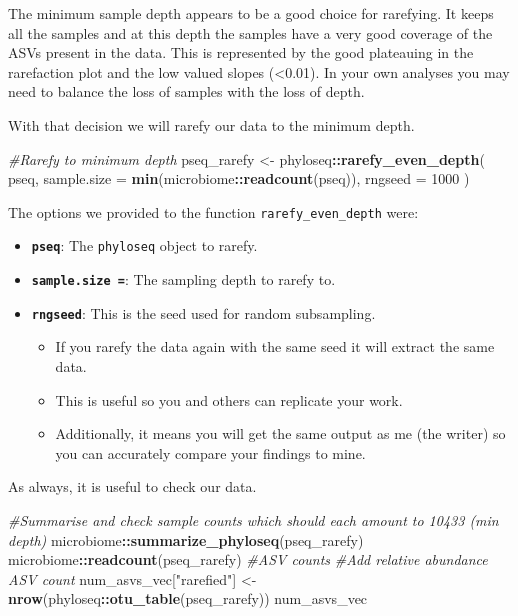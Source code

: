 \documentclass[
]{book}
\newenvironment{Shaded}{\begin{snugshade}}{\end{snugshade}}
\newcommand{\AttributeTok}[1]{\textcolor[rgb]{0.13,0.29,0.53}{#1}}
\newcommand{\CommentTok}[1]{\textcolor[rgb]{0.56,0.35,0.01}{\textit{#1}}}
\newcommand{\DecValTok}[1]{\textcolor[rgb]{0.00,0.00,0.81}{#1}}
\newcommand{\FunctionTok}[1]{\textcolor[rgb]{0.13,0.29,0.53}{\textbf{#1}}}
\newcommand{\NormalTok}[1]{#1}
\newcommand{\OtherTok}[1]{\textcolor[rgb]{0.56,0.35,0.01}{#1}}
\newcommand{\SpecialCharTok}[1]{\textcolor[rgb]{0.81,0.36,0.00}{\textbf{#1}}}
\newcommand{\StringTok}[1]{\textcolor[rgb]{0.31,0.60,0.02}{#1}}
\providecommand{\tightlist}{%
  \setlength{\itemsep}{0pt}\setlength{\parskip}{0pt}}
\begin{document}
The minimum sample depth appears to be a good choice for rarefying.
It keeps all the samples and at this depth the samples have a very good coverage of the ASVs present in the data.
This is represented by the good plateauing in the rarefaction plot and the low valued slopes (\textless0.01).
In your own analyses you may need to balance the loss of samples with the loss of depth.

With that decision we will rarefy our data to the minimum depth.

\begin{Shaded}
\begin{Highlighting}[]
\CommentTok{\#Rarefy to minimum depth}
\NormalTok{pseq\_rarefy }\OtherTok{\textless{}{-}}\NormalTok{ phyloseq}\SpecialCharTok{::}\FunctionTok{rarefy\_even\_depth}\NormalTok{(}
\NormalTok{  pseq, }\AttributeTok{sample.size =} \FunctionTok{min}\NormalTok{(microbiome}\SpecialCharTok{::}\FunctionTok{readcount}\NormalTok{(pseq)),}
  \AttributeTok{rngseed =} \DecValTok{1000}
\NormalTok{  )}
\end{Highlighting}
\end{Shaded}

The options we provided to the function \texttt{rarefy\_even\_depth} were:

\begin{itemize}
\tightlist
\item
  \textbf{\texttt{pseq}}: The \texttt{phyloseq} object to rarefy.
\item
  \textbf{\texttt{sample.size\ =}}: The sampling depth to rarefy to.
\item
  \textbf{\texttt{rngseed}}: This is the seed used for random subsampling.

  \begin{itemize}
  \tightlist
  \item
    If you rarefy the data again with the same seed it will extract the same data.
  \item
    This is useful so you and others can replicate your work.
  \item
    Additionally, it means you will get the same output as me (the writer) so you can accurately compare your findings to mine.
  \end{itemize}
\end{itemize}

As always, it is useful to check our data.

\begin{Shaded}
\begin{Highlighting}[]
\CommentTok{\#Summarise and check sample counts which should each amount to 10433 (min depth)}
\NormalTok{microbiome}\SpecialCharTok{::}\FunctionTok{summarize\_phyloseq}\NormalTok{(pseq\_rarefy)}
\NormalTok{microbiome}\SpecialCharTok{::}\FunctionTok{readcount}\NormalTok{(pseq\_rarefy)}
\CommentTok{\#ASV counts}
\CommentTok{\#Add relative abundance ASV count}
\NormalTok{num\_asvs\_vec[}\StringTok{"rarefied"}\NormalTok{] }\OtherTok{\textless{}{-}} \FunctionTok{nrow}\NormalTok{(phyloseq}\SpecialCharTok{::}\FunctionTok{otu\_table}\NormalTok{(pseq\_rarefy))}
\NormalTok{num\_asvs\_vec}
\end{Highlighting}
\end{Shaded}
\end{document}
